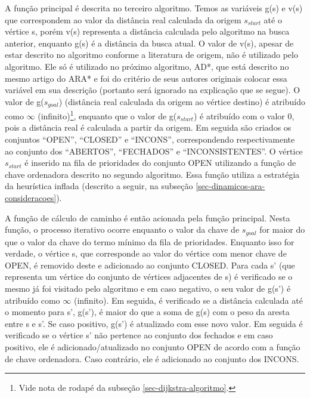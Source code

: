
A função principal é descrita no terceiro algoritmo. Temos as variáveis g(s) e v(s) que correspondem ao valor da distância real calculada da origem $s_{start}$ até o vértice s, porém v(s) representa a distância calculada pelo algoritmo na busca anterior, enquanto g(s) é a distância da busca atual. O valor de v(s), apesar de estar descrito no algoritmo conforme a literatura de origem, não é utilizado pelo algoritmo. Ele só é utilizado no próximo algoritmo, AD*, que está descrito no mesmo artigo do ARA* e foi do critério de seus autores originais colocar essa variável em sua descrição (portanto será ignorado na explicação que se segue). O valor de g($s_{goal}$) (distância real calculada da origem ao vértice destino) é atribuído como $\infty$ (infinito)\footnote{Vide nota de rodapé da subseção \ref{sec-dijkstra-algoritmo}.}, enquanto que o valor de g($s_{start}$) é atribuído com o valor 0, pois a distância real é calculada a partir da origem. Em seguida são criados os conjuntos ``OPEN'', ``CLOSED'' e ``INCONS'', correspondendo respectivamente ao conjunto dos ``ABERTOS'', ``FECHADOS'' e ``INCONSISTENTES''. O vértice $s_{start}$ é inserido na fila de prioridades do conjunto OPEN utilizando a função de chave ordenadora descrito no segundo algoritmo. Essa função utiliza a estratégia da heurística inflada (descrito a seguir, na subseção \ref{sec-dinamicos-ara-consideracoes}).

A função de cálculo de caminho é então acionada pela função principal. Nesta função, o processo iterativo ocorre enquanto o valor da chave de $s_{goal}$ for maior do que o valor da chave do termo mínimo da fila de prioridades. Enquanto isso for verdade, o vértice s, que corresponde ao valor do vértice com menor chave de OPEN, é removido deste e adicionado ao conjunto CLOSED. Para cada s' (que representa um vértice do conjunto de vértices adjacentes de s) é verificado se o mesmo já foi visitado pelo algoritmo e em caso negativo, o seu valor de g(s') é atribuído como $\infty$ (infinito). Em seguida, é verificado se a distância calculada até o momento para s', g(s'), é maior do que a soma de g(s) com o peso da aresta entre s e s'. Se caso positivo, g(s') é atualizado com esse novo valor. Em seguida é verificado se o vértice s' não pertence ao conjunto dos fechados e em caso positivo, ele é adicionado/atualizado no conjunto OPEN de acordo com a função de chave ordenadora. Caso contrário, ele é adicionado ao conjunto dos INCONS.

